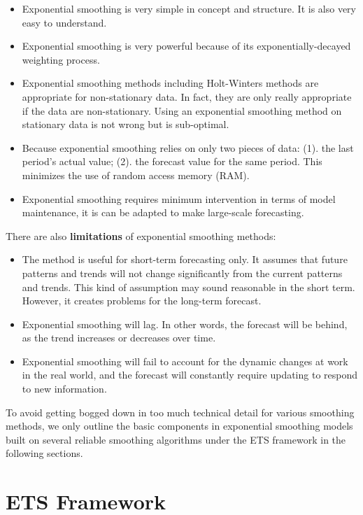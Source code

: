 \documentclass[
]{book}
\begin{document}
\begin{itemize}
\item
  Exponential smoothing is very simple in concept and structure. It is also very easy to understand.
\item
  Exponential smoothing is very powerful because of its exponentially-decayed weighting process.
\item
  Exponential smoothing methods including Holt-Winters methods are appropriate for non-stationary data. In fact, they are only really appropriate if the data are non-stationary. Using an exponential smoothing method on stationary data is not wrong but is sub-optimal.
\item
  Because exponential smoothing relies on only two pieces of data: (1). the last period's actual value; (2). the forecast value for the same period. This minimizes the use of random access memory (RAM).
\item
  Exponential smoothing requires minimum intervention in terms of model maintenance, it is can be adapted to make large-scale forecasting.
\end{itemize}

There are also \textbf{limitations} of exponential smoothing methods:

\begin{itemize}
\item
  The method is useful for short-term forecasting only. It assumes that future patterns and trends will not change significantly from the current patterns and trends. This kind of assumption may sound reasonable in the short term. However, it creates problems for the long-term forecast.
\item
  Exponential smoothing will lag. In other words, the forecast will be behind, as the trend increases or decreases over time.
\item
  Exponential smoothing will fail to account for the dynamic changes at work in the real world, and the forecast will constantly require updating to respond to new information.
\end{itemize}

To avoid getting bogged down in too much technical detail for various smoothing methods, we only outline the basic components in exponential smoothing models built on several reliable smoothing algorithms under the ETS framework in the following sections.

\hypertarget{ets-framework}{%
\section{ETS Framework}\label{ets-framework}}
\end{document}
